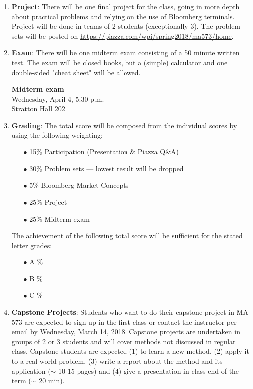 \documentclass[final, 12pt]{article}
\begin{document}
{\begin{enumerate}
\vspace{5pt}


\item
\textbf{Project}: There will be one final project for the  class, going in more depth about practical problems and relying on the use of Bloomberg terminals. Project will be done in teams of 2 students (exceptionally 3). The problem sets will be posted on \url{https://piazza.com/wpi/spring2018/ma573/home}.

\vspace{5pt}

\item
\textbf{Exam}: There will be one midterm exam consisting of a 50 minute written test. The exam will be closed books, but a (simple) calculator and one double-sided "cheat sheet" will be allowed.
\begin{tabbing}
\textbf{Midterm exam}\\
 Wednesday, April 4, 5:30 p.m.\\
Stratton Hall 202 
\end{tabbing}


\item
\textbf{Grading}: The total score will be composed from the individual scores by using the following weighting: 
\begin{itemize}
\item[$\bullet$] 15\% Participation (Presentation \& Piazza Q\&A)
\item[$\bullet$] 30\% Problem sets \quad --- \quad lowest result will be dropped
\item[$\bullet$] 5\% Bloomberg Market Concepts
\item[$\bullet$] 25\% Project
\item[$\bullet$] 25\% Midterm exam
\end{itemize}

The achievement of the following total score will be sufficient for the stated letter grades:
\begin{itemize}
\item[$\bullet$] A \%
\item[$\bullet$] B \%
\item[$\bullet$] C \%
\end{itemize}

\vspace{5pt}

\item
\textbf{Capstone Projects}: Students who want to do their capstone project in MA 573 are expected to sign up in the first class or contact the instructor per email by  Wednesday, March 14, 2018. Capstone projects are undertaken in groups of 2 or 3 students and will cover methods not discussed in regular class. Capstone students are expected (1) to learn a new method, (2) apply it to a real-world problem, (3) write a report about the method and its application ($\sim$ 10-15 pages) and (4) give a presentation in class end of the term ($\sim$ 20 min).


\end{enumerate}}
\end{document}
